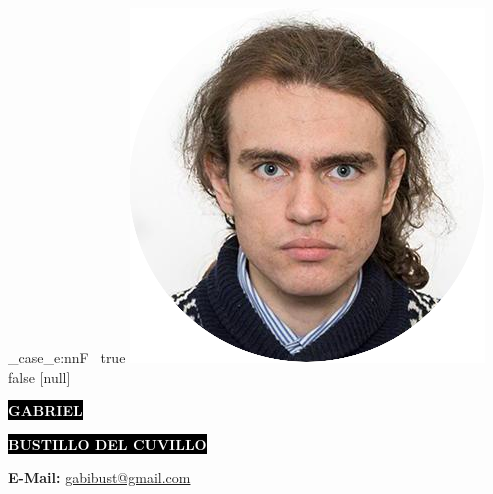 \documentclass[9pt]{developercv} %
\begin{document}




\begin{minipage}[t]{0.45\textwidth} %

	\vspace{-\baselineskip} %
\ExplSyntaxOn

\str_case_e:nnF~{\photo}
{
	{true}{
			  \includegraphics[width=0.4\linewidth]{profile.png}
		}
	{false}{}
}
{[null]}%

\ExplSyntaxOff



	\colorbox{black}{{\huge\textcolor{white}{\textbf{\MakeUppercase{Gabriel}}}}} %
	
	\colorbox{black}{{\huge\textcolor{white}{\textbf{\MakeUppercase{Bustillo del Cuvillo}}}}} %
	
	\vspace{6pt}
	
	{\huge \GetTitleLocalized{\langsa}{\jobtype}} %
\end{minipage}
\begin{minipage}[t]{0.233\textwidth} %
	\vspace{-\baselineskip} %
	
	\GetLocationLocalized{\langsa}
	\textbf{E-Mail: }{\href{mailto:gabibust@gmail.com}{gabibust@gmail.com}}\\	
\end{minipage}
\end{document}

